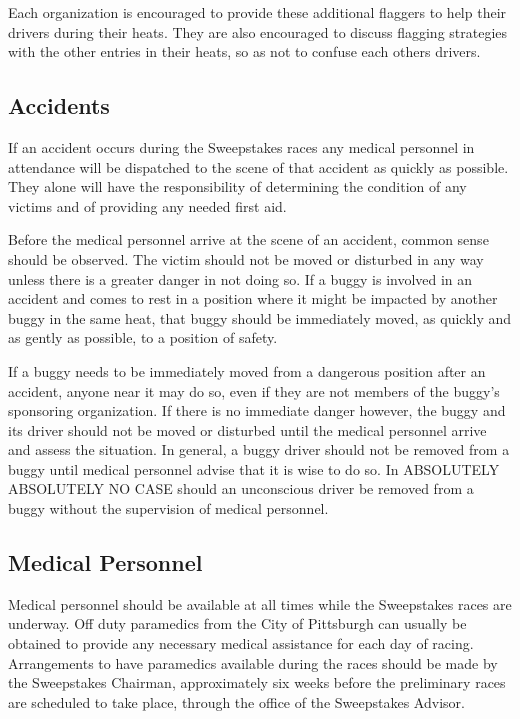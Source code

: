 	Each organization is encouraged to provide these additional flaggers to help
	their drivers during their heats. They are also encouraged to discuss flagging
	strategies with the other entries in their heats, so as not to confuse each
	others drivers.

\subsection{Accidents}

	If an accident occurs during the Sweepstakes races any medical personnel in
	attendance will be dispatched to the scene of that accident as quickly as
	possible. They alone will have the responsibility of determining the condition
	of any victims and of providing any needed first aid.

	Before the medical personnel arrive at the scene of an accident, common sense
	should be observed. The victim should not be moved or disturbed in any way
	unless there is a greater danger in not doing so. If a buggy is involved in an
	accident and comes to rest in a position where it might be impacted by another
	buggy in the same heat, that buggy should be immediately moved, as quickly and
	as gently as possible, to a position of safety.

	If a buggy needs to be immediately moved from a dangerous position after an
	accident, anyone near it may do so, even if they are not members of the buggy's
	sponsoring organization. If there is no immediate danger however, the buggy and
	its driver should not be moved or disturbed until the medical personnel arrive
	and assess the situation. In general, a buggy driver should not be removed from
	a buggy until medical personnel advise that it is wise to do so. In ABSOLUTELY
	ABSOLUTELY NO CASE should an unconscious driver be removed from a buggy without
	the supervision of medical personnel.

\subsection{Medical Personnel}

	Medical personnel should be available at all times while the Sweepstakes races
	are underway. Off duty paramedics from the City of Pittsburgh can usually be
	obtained to provide any necessary medical assistance for each day of racing.
	Arrangements to have paramedics available during the races should be made by
	the Sweepstakes Chairman, approximately six weeks before the preliminary races
	are scheduled to take place, through the office of the Sweepstakes Advisor.

